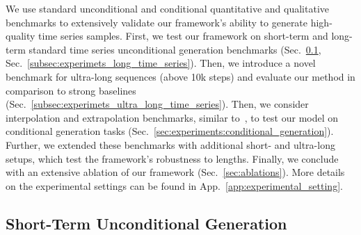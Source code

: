 \documentclass{article}
\begin{document}
We use standard unconditional and conditional quantitative and qualitative benchmarks to extensively validate our framework's ability to generate high-quality time series samples. First, we test our framework on short-term and long-term standard time series unconditional generation benchmarks (Sec.~\ref{subsec:experimets_short_time_series}, Sec.~\ref{subsec:experimets_long_time_series}). Then, we introduce a novel benchmark for ultra-long sequences (above 10k steps) and evaluate our method in comparison to strong baselines (Sec.~\ref{subsec:experimets_ultra_long_time_series}). Then, we consider interpolation and extrapolation benchmarks, similar to~\cite{schirmer2022modeling}, to test our model on conditional generation tasks (Sec.~\ref{sec:experiments:conditional_generation}). Further, we extended these benchmarks with additional short- and ultra-long setups, which test the framework's robustness to lengths. Finally, we conclude with an extensive ablation of our framework (Sec.~\ref{sec:ablations}). More details on the experimental settings can be found in App.~\ref{app:experimental_setting}.


\subsection{Short-Term Unconditional Generation}
\label{subsec:experimets_short_time_series}
\end{document}
